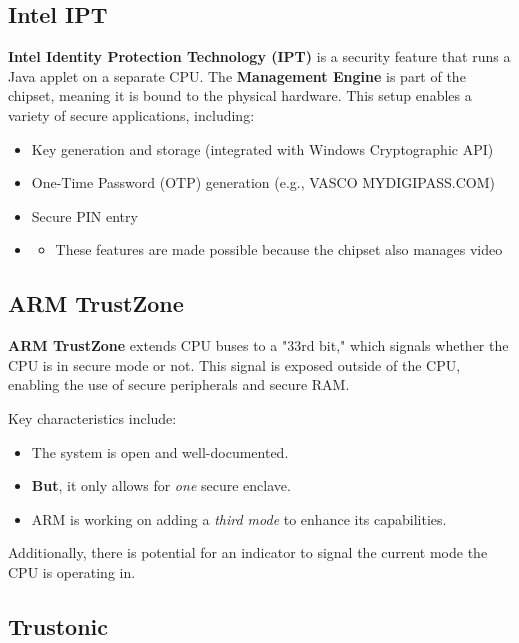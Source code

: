 \subsection{Intel IPT}

\textbf{Intel Identity Protection Technology (IPT)} is a security feature that runs a Java applet on a separate CPU. The \textbf{Management Engine} is part of the chipset, meaning it is bound to the physical hardware. This setup enables a variety of secure applications, including:

\begin{itemize}
    \item Key generation and storage (integrated with Windows Cryptographic API)
    \item One-Time Password (OTP) generation (e.g., VASCO MYDIGIPASS.COM)
    \item Secure PIN entry
    \item \begin{itemize}
        \item These features are made possible because the chipset also manages video
    \end{itemize}
\end{itemize}

\subsection{ARM TrustZone}

\textbf{ARM TrustZone} extends CPU buses to a "33rd bit," which signals whether the CPU is in secure mode or not. This signal is exposed outside of the CPU, enabling the use of secure peripherals and secure RAM. 

Key characteristics include:
\begin{itemize}
    \item The system is open and well-documented.
    \item \textbf{But}, it only allows for \textit{one} secure enclave.
    \item ARM is working on adding a \textit{third mode} to enhance its capabilities.
\end{itemize}

Additionally, there is potential for an indicator to signal the current mode the CPU is operating in.

\subsection{Trustonic}

